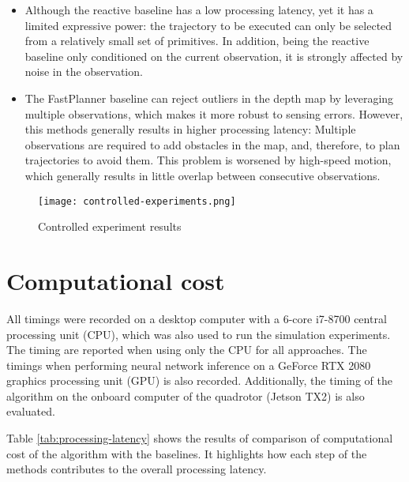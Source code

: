 \begin{itemize}
	\item Although the reactive \cite{reactive_method} baseline has a low processing latency, yet it has a limited expressive power: the trajectory to be executed can only be selected from a relatively small set of primitives. In addition, being the reactive \cite{reactive_method} baseline only conditioned on the current observation, it is strongly affected by noise in the observation.
	\item The FastPlanner \cite{fastPlanner} baseline can reject outliers in the depth map by leveraging multiple observations, which makes it more robust to sensing errors. However, this methods generally results in higher processing latency: Multiple observations are required to add obstacles in the map, and, therefore, to plan trajectories to avoid them. This problem is worsened by high-speed motion, which generally results in little overlap between consecutive observations.
\end{itemize}

\begin{figure}[!h]
	\texttt{[image: controlled-experiments.png]}
	\caption{Controlled experiment results}
	\label{fig:stimulated-results}
\end{figure}


\section{Computational cost}
All timings were recorded on a desktop computer with a 6-core i7-8700 central processing unit (CPU), which was also used to run the simulation experiments. The timing are reported when using only the CPU for all approaches. The timings when performing neural network inference on a GeForce RTX 2080 graphics processing unit (GPU) is also recorded. Additionally, the timing of the algorithm on the onboard computer of the quadrotor (Jetson TX2) is also evaluated.

Table \ref{tab:processing-latency} shows the results of comparison of computational cost of the algorithm with the baselines. It highlights how each step of the methods contributes to the overall processing latency. 

